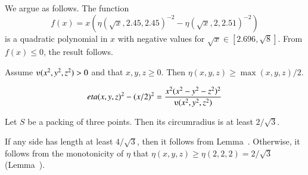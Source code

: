 \begin{tarskidata}
\begin{tarski}
\begin{proved}
We argue as follows. The function
  $$f(x) = x(\eta(\sqrt{x},2.45,2.45)^{-2}-\eta(\sqrt{x},2,2.51)^{-2})
  $$
is a quadratic
polynomial in $x$ with negative values for
$\sqrt{x}\in[2.696,\sqrt{8}]$. From $f(x)\le 0$, the result follows.
\swallowed\end{proved}
\end{tarski}





\begin{tarski}

\begin{lemma}
Assume $\ups(x^2,y^2,z^2)>0$ and that $x,y,z\ge0$.  Then
$\eta(x,y,z)\ge \max(x,y,z)/2$.
\end{lemma}

\begin{proved} 
  $$\eta(x,y,z)^2 - (x/2)^2 =
  \frac{x^2 (x^2-y^2-z^2)^2}{\ups(x^2,y^2,z^2)}
  $$
\swallowed\end{proved}
\end{tarski}





\begin{tarski}

\begin{lemma}
Let $S$ be a packing of three points.
 Then its circumradius is at least $2/\sqrt3$.
\end{lemma}

\begin{proved} If any side has length at least $4/\sqrt3$, then
it follows from Lemma~.  Otherwise, it
follows from the monotonicity of $\eta$ that
$\eta(x,y,z)\ge \eta(2,2,2) = 2/\sqrt3$ (Lemma~).
\swallowed\end{proved}
\end{tarski}

















\end{tarskidata}
